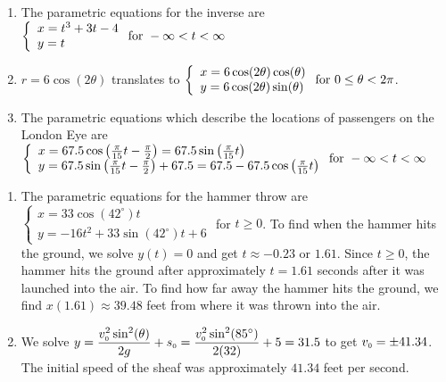 \begin{enumerate} 
\setcounter{enumi}{\value{HW}}

\item  The parametric equations for the inverse are ${\displaystyle \left\{ \begin{array}{l} x = t^3+3t-4 \\ y = t  \end{array} \right. \vspace{.25in} \mbox{for } -\infty < t < \infty}$

\item  $r = 6\cos(2\theta)$ translates to  ${\displaystyle \left\{ \begin{array}{l} x = 6\cos(2\theta)\cos(\theta) \\ y = 6\cos(2\theta)\sin(\theta)  \end{array} \right. \vspace{.25in} \mbox{for } 0 \leq \theta <  2\pi}$.

\item The parametric equations which describe the locations of passengers on the London Eye are ${\displaystyle \left\{ \begin{array}{l} x = 67.5 \cos\left(\frac{\pi}{15} t - \frac{\pi}{2} \right) = 67.5 \sin\left(\frac{\pi}{15} t \right) \\ y = 67.5 \sin\left(\frac{\pi}{15} t - \frac{\pi}{2} \right) + 67.5 = 67.5 - 67.5 \cos\left(\frac{\pi}{15} t \right)   \end{array} \right. \vspace{.25in} \mbox{for } -\infty < t < \infty}$ 


\setcounter{HW}{\value{enumi}}
\end{enumerate}


\begin{enumerate} 
\setcounter{enumi}{\value{HW}}

\item  The parametric equations for the hammer throw are ${\displaystyle \left\{ \begin{array}{l} x = 33 \cos(42^{\circ}) t \\ y =-16t^2 +  33 \sin(42^{\circ}) t + 6 \end{array} \right.}$ for $t \geq 0$.  To find when the hammer hits the ground, we solve $y(t) = 0$ and get $t \approx -0.23$ or $1.61$.  Since $t \geq 0$, the hammer hits the ground after approximately $t = 1.61$ seconds after it was launched into the air.  To find how far away the hammer hits the ground, we find $x(1.61) \approx 39.48$ feet from where it was thrown into the air.

\addtocounter{enumi}{1}

\item  We solve $y = \dfrac{v_{\text{\tiny$0$}}^2 \sin^{2}(\theta)}{2g} + s_{\text{\tiny $0$}}  = \dfrac{v_{\text{\tiny$0$}}^2 \sin^{2}(85^{\circ})}{2(32)} + 5 = 31.5$ to get $v_{\text{\tiny$0$}} = \pm 41.34$.  The initial speed of the sheaf was approximately $41.34$ feet per second.

\setcounter{HW}{\value{enumi}}
\end{enumerate}








\closegraphsfile
